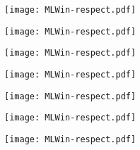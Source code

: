 \begin{figure}[htbp]
\centerline{\texttt{[image: MLWin-respect.pdf]}}
\label{partinfosheet8}
\end{figure}

\newpage

\begin{figure}[htbp]
\centerline{\texttt{[image: MLWin-respect.pdf]}}
\label{partinfosheet9}
\end{figure}

\newpage

\begin{figure}[htbp]
\centerline{\texttt{[image: MLWin-respect.pdf]}}
\label{partinfosheet10}
\end{figure}

\newpage

\begin{figure}[htbp]
\centerline{\texttt{[image: MLWin-respect.pdf]}}
\label{partinfosheet11}
\end{figure}

\newpage

\begin{figure}[htbp]
\centerline{\texttt{[image: MLWin-respect.pdf]}}
\label{partinfosheet12}
\end{figure}

\newpage

\begin{figure}[htbp]
\centerline{\texttt{[image: MLWin-respect.pdf]}}
\label{partinfosheet13}
\end{figure}

\newpage

\begin{figure}[htbp]
\centerline{\texttt{[image: MLWin-respect.pdf]}}
\label{partinfosheet14}
\end{figure}